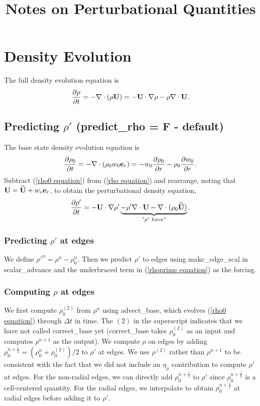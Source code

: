 \documentclass[11pt]{article}
\title{Notes on Perturbational Quantities}
\def\half  {\frac{1}{2}}
\def\eb    {{\bf e}}
\def\Ub    {{\bf U}}
\def\Ubt   {\widetilde{\bf U}}
\begin{document}
\maketitle
\tableofcontents
\cleardoublepage

\section{Density Evolution}
The full density evolution equation is
\begin{equation}
\frac{\partial\rho}{\partial t} = -\nabla\cdot(\rho\Ub) = -\Ub\cdot\nabla\rho 
- \rho\nabla\cdot\Ub. \label{rho equation}
\end{equation}
\subsection{Predicting $\rho'$ (predict\_rho = F - default)}
The base state density evolution equation is
\begin{equation}
\frac{\partial\rho_0}{\partial t} = -\nabla\cdot(\rho_0 w_0 \eb_r) = 
-w_0\frac{\partial\rho_0}{\partial r} - \rho_0\frac{\partial w_0}{\partial r}.
\label{rho0 equation}
\end{equation}
Subtract (\ref{rho0 equation}) from (\ref{rho equation}) and rearrange, noting that 
$\Ub = \Ubt + w_o\eb_r$, to obtain the perturbational density equation,
\begin{equation}
\frac{\partial\rho'}{\partial t} = -\Ub\cdot\nabla\rho' \underbrace{- \rho'\nabla\cdot\Ub 
- \nabla\cdot(\rho_0\Ubt)}_{"\rho' ~ \text{force}"}. 
\label{rhoprime equation}
\end{equation}
\subsubsection{Predicting $\rho'$ at edges}
We define $\rho'^n = \rho^n - \rho_0^n$.  Then we predict $\rho'$ to edges using 
make\_edge\_scal in scalar\_advance and the underbraced term in (\ref{rhoprime equation}) 
as the forcing.
\subsubsection{Computing $\rho$ at edges}\label{Computing rho at edges}
We first compute $\rho_0^{(2)}$ from $\rho^n$ using advect\_base, which evolves 
(\ref{rho0 equation}) through $\Delta t$ in time.  The $(2)$ in the 
superscript indicates that we have not called correct\_base yet (correct\_base takes 
$\rho_0^{(2)}$ as an input and computes $\rho^{n+1}$ as the output).  We compute $\rho$ on 
edges by adding $\rho_0^{n+\half} = (\rho_0^n + \rho_0^{(2)}) / 2$ to $\rho'$ at edges.  We 
use $\rho^{(2)}$ rather than $\rho^{n+1}$ to be consistent with the fact that we did not 
include an $\eta_\rho$ contribution to compute $\rho'$ at edges.  For the non-radial edges, 
we can directly add $\rho_0^{n+\half}$ to $\rho'$ since $\rho_0^{n+\half}$ is a cell-centered 
quantity.  For the radial edges, we interpolate to obtain $\rho_0^{n+\half}$ at radial edges 
before adding it to $\rho'$.
\end{document}
